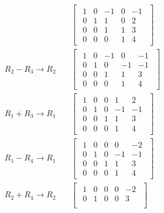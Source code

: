 \documentclass{zc-ust-hw}
\begin{document}
\begin{enumerate}[label=\roman*.]
\begin{align}
      &\quad
      \begin{bmatrix} 
        \begin{array}{cccc|c}
          1 & 0 & -1 & 0 & -1 \\
          0 & 1 & 1  & 0 & 2  \\
          0 & 0 & 1  & 1 & 3  \\
          0 & 0 & 0  & 1 & 4
        \end{array}
      \end{bmatrix} \\
      R_2 - R_3 \rightarrow R_2
      &\quad
      \begin{bmatrix} 
        \begin{array}{cccc|c}
          1 & 0 & -1 & 0 & -1 \\
          0 & 1 & 0  & -1& -1 \\
          0 & 0 & 1  & 1 & 3  \\
          0 & 0 & 0  & 1 & 4
        \end{array}
      \end{bmatrix} \\
      R_1 + R_3 \rightarrow R_1
      &\quad
      \begin{bmatrix} 
        \begin{array}{cccc|c}
          1 & 0 & 0 & 1 & 2 \\
          0 & 1 & 0 & -1& -1 \\
          0 & 0 & 1 & 1 & 3  \\
          0 & 0 & 0 & 1 & 4
        \end{array}
      \end{bmatrix} \\
      R_1 - R_4 \rightarrow R_1
      &\quad
      \begin{bmatrix} 
        \begin{array}{cccc|c}
          1 & 0 & 0 & 0 & -2 \\
          0 & 1 & 0 & -1& -1 \\
          0 & 0 & 1 & 1 & 3  \\
          0 & 0 & 0 & 1 & 4
        \end{array}
      \end{bmatrix} \\
      R_2 + R_4 \rightarrow R_2
      &\quad
      \begin{bmatrix} 
        \begin{array}{cccc|c}
          1 & 0 & 0 & 0 & -2 \\
          0 & 1 & 0 & 0 & 3  \\

\end{array}
\end{bmatrix}
\end{align}
\end{enumerate}
\end{document}
